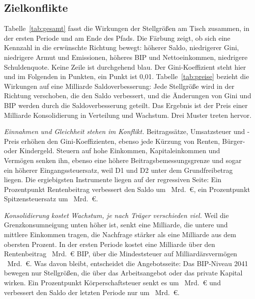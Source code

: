 \subsection{Zielkonflikte}
\label{sec:zielkonflikte}

Tabelle~\ref{tab:gesamt} fasst die Wirkungen der Stellgrößen am Tisch zusammen,
in der ersten Periode und am Ende des Pfads. Die Färbung zeigt, ob sich eine
Kennzahl in die erwünschte Richtung bewegt: höherer Saldo, niedrigerer Gini,
niedrigere Armut und Emissionen, höheres BIP und Nettoeinkommen, niedrigere
Schuldenquote. Keine Zeile ist durchgehend blau. Der Gini-Koeffizient steht hier
und im Folgenden in Punkten, ein Punkt ist 0,01. Tabelle~\ref{tab:preise} bezieht
die Wirkungen auf eine Milliarde Saldoverbesserung: Jede Stellgröße wird in der
Richtung verschoben, die den Saldo verbessert, und die Änderungen von Gini und
BIP werden durch die Saldoverbesserung geteilt. Das Ergebnis ist der Preis
einer Milliarde Konsolidierung in Verteilung und Wachstum. Drei Muster treten
hervor.

\emph{Einnahmen und Gleichheit stehen im Konflikt.} Beitragssätze,
Umsatzsteuer und \COz-Preis erhöhen den Gini-Koeffizienten, ebenso jede
Kürzung von Renten, Bürger- oder Kindergeld. Steuern auf hohe Einkommen,
Kapitaleinkommen und Vermögen senken ihn, ebenso eine höhere
Beitragsbemessungsgrenze und sogar ein höherer Eingangssteuersatz, weil D1
und D2 unter dem Grundfreibetrag liegen. Die ergiebigsten Instrumente liegen
auf der regressiven Seite: Ein Prozentpunkt Rentenbeitrag verbessert den Saldo
um ~Mrd.~\euro, ein Prozentpunkt Spitzensteuersatz um
~Mrd.~\euro.

\emph{Konsolidierung kostet Wachstum, je nach Träger verschieden viel.} Weil
die Grenzkonsumneigung unten höher ist, senkt eine Milliarde, die untere und
mittlere Einkommen tragen, die Nachfrage stärker als eine Milliarde aus dem
obersten Prozent. In der ersten Periode kostet eine Milliarde über den
Rentenbeitrag ~Mrd.~\euro{} BIP, über die Mindeststeuer
auf Milliardärsvermögen ~Mrd.~\euro. Was davon bleibt,
entscheidet die Angebotsseite: Das BIP-Niveau 2041 bewegen nur Stellgrößen, die
über das Arbeitsangebot oder das private Kapital wirken. Ein Prozentpunkt
Körperschaftsteuer senkt es um ~Mrd.~\euro{} und verbessert
den Saldo der letzten Periode nur um ~Mrd.~\euro.

